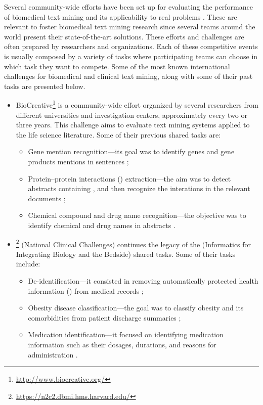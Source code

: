 Several community-wide efforts have been set up for evaluating the performance of biomedical text mining and its applicability to real  problems \parencite{huang2016a}.
These are relevant to foster biomedical text mining research since several teams around the world present their state-of-the-art solutions.
These efforts and challenges are often prepared by researchers and organizations.
Each of these competitive events is usually composed by a variety of tasks where participating teams can choose in which task they want to compete.
Some of the most known international challenges for biomedical and clinical text mining, along with some of their past  tasks are presented below.

\begin{itemize}

\item
BioCreative\footnote{\url{http://www.biocreative.org/}} is a community-wide effort organized by several researchers from different universities and investigation centers, approximately every two or three years.
This challenge aims to evaluate text mining systems applied to the life science literature.
Some of their previous shared tasks are:

\begin{itemize}[topsep=0pt]

\item
Gene mention recognition---its goal was to identify genes and gene products mentions in  sentences \parencite{smith2008a};

\item
Protein--protein interactions () extraction---the aim was to detect  abstracts containing , and then recognize the interations in the relevant documents \parencite{krallinger2011a};

\item
Chemical compound and drug name recognition---the objective was to identify chemical and drug names in  abstracts \parencite{krallinger2015a}.

\end{itemize}

\item
{}\footnote{\url{https://n2c2.dbmi.hms.harvard.edu/}} (National  Clinical Challenges) continues the legacy of the  (Informatics for Integrating Biology and the Bedside)  shared tasks. Some of their tasks include:

\begin{itemize}[topsep=0pt]
\item
De-identification---it consisted in removing automatically protected health information () from medical records \parencite{uzuner2007a};
\item
Obesity disease classification---the goal was to classify obesity and its comorbidities from patient discharge summaries \parencite{uzuner2009a};
\item
Medication identification---it focused on identifying medication information such as their dosages, durations, and reasons for administration \parencite{uzuner2010b}.
\end{itemize}


\end{itemize}
